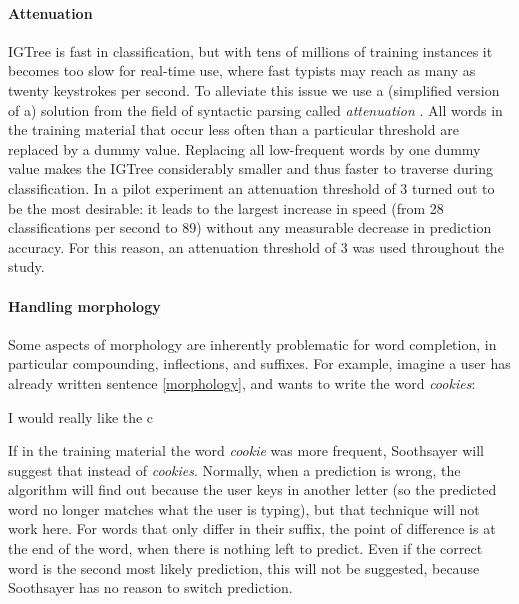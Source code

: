 \documentclass[12pt]{article}
\begin{document}
\paragraph{Attenuation}

IGTree is fast in classification, but with tens of millions of training instances it becomes too slow for real-time use, where fast typists may reach as many as twenty keystrokes per second. To alleviate this issue we  use a (simplified version of a) solution from the field of syntactic parsing called \emph{attenuation} \cite{eisner96}. All words in the training material that occur less often than a particular threshold are replaced by a dummy value. Replacing all low-frequent words by one dummy value makes the IGTree considerably smaller and thus faster to traverse during classification. In a pilot experiment an attenuation threshold of 3 turned out to be the most desirable: it leads to the largest increase in speed (from 28 classifications per second to 89) without any measurable decrease in prediction accuracy. For this reason, an attenuation threshold of 3 was used throughout the study.

\paragraph{Handling morphology} \label{early}

Some aspects of morphology are inherently problematic for word completion, in particular compounding, inflections, and suffixes. For example, imagine a user has already written sentence \ref{morphology}, and wants to write the word \emph{cookies}:

\begin{examples}
\item I would really like the c \label{morphology}
\end{examples}

If in the training material the word \emph{cookie} was more frequent, Soothsayer will suggest that instead of \emph{cookies}. Normally, when a prediction is wrong, the algorithm will find out because the user keys in another letter (so the predicted word no longer matches what the user is typing), but that technique will not work here. For words that only differ in their suffix, the point of difference is at the end of the word, when there is nothing left to predict. Even if the correct word is the second most likely prediction, this will not be suggested, because Soothsayer has no reason to switch prediction.
\end{document}
